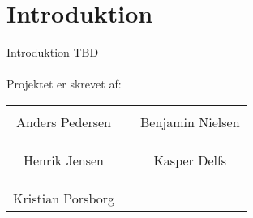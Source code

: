 \chapter*{Introduktion}
Introduktion TBD
 \\\\


Projektet er skrevet af:\\
%
\phantom{Luft}\vspace{3cm}
\begin{table}[H]
	\centering
		\begin{tabular}{c c c}
			\underline{\phantom{JAERJAERJAERJAERGO}} & \phantom{cookies} & \underline{\phantom{JAERJAERJAERJAERGO}} \\
			Anders Pedersen			& \phantom{cookies} & Benjamin Nielsen		\\
			&&\\
			&&\\
			\underline{\phantom{JAERJAERJAERJAERGO}} & \phantom{cookies} & \underline{\phantom{JAERJAERJAERJAERGO}} \\
			Henrik Jensen			& \phantom{cookies} & Kasper Delfs		\\
			&&\\
			&&\\
	    \underline{\phantom{JAERJAERJAERJAERGO}} & \phantom{cookies} & \\
			Kristian Porsborg  					 
			&&\\							
		\end{tabular}
\end{table}